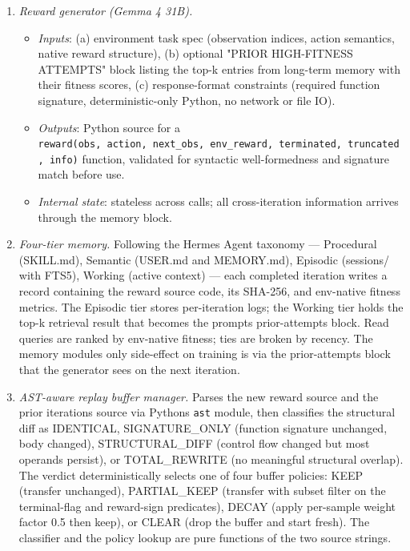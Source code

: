 \begin{enumerate}
\def\labelenumi{\arabic{enumi}.}
\item
  \emph{Reward generator (Gemma 4 31B).}

  \begin{itemize}
  \tightlist
  \item
    \emph{Inputs}: (a) environment task spec (observation indices, action semantics, native reward structure), (b) optional "PRIOR HIGH-FITNESS ATTEMPTS" block listing the top-k entries from long-term memory with their fitness scores, (c) response-format constraints (required function signature, deterministic-only Python, no network or file IO).
  \item
    \emph{Outputs}: Python source for a \texttt{reward(obs,\ action,\ next\_obs,\ env\_reward,\ terminated,\ truncated,\ info)} function, validated for syntactic well-formedness and signature match before use.
  \item
    \emph{Internal state}: stateless across calls; all cross-iteration information arrives through the memory block.
  \end{itemize}
\item
  \emph{Four-tier memory.} Following the Hermes Agent taxonomy --- Procedural (SKILL.md), Semantic (USER.md and MEMORY.md), Episodic (sessions/ with FTS5), Working (active context) --- each completed iteration writes a record containing the reward source code, its SHA-256, and env-native fitness metrics. The Episodic tier stores per-iteration logs; the Working tier holds the top-k retrieval result that becomes the prompt\textquotesingle s prior-attempts block. Read queries are ranked by env-native fitness; ties are broken by recency. The memory module\textquotesingle s only side-effect on training is via the prior-attempts block that the generator sees on the next iteration.
\item
  \emph{AST-aware replay buffer manager.} Parses the new reward source and the prior iteration\textquotesingle s source via Python\textquotesingle s \texttt{ast} module, then classifies the structural diff as IDENTICAL, SIGNATURE\_ONLY (function signature unchanged, body changed), STRUCTURAL\_DIFF (control flow changed but most operands persist), or TOTAL\_REWRITE (no meaningful structural overlap). The verdict deterministically selects one of four buffer policies: KEEP (transfer unchanged), PARTIAL\_KEEP (transfer with subset filter on the terminal-flag and reward-sign predicates), DECAY (apply per-sample weight factor 0.5 then keep), or CLEAR (drop the buffer and start fresh). The classifier and the policy lookup are pure functions of the two source strings.
\end{enumerate}

